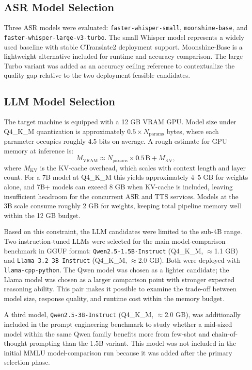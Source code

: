 \documentclass[12pt, a4paper]{article}
\begin{document}
\subsection{ASR Model Selection}

Three ASR models were evaluated: \texttt{faster-whisper-small}, \texttt{moonshine-base}, and\\ \texttt{faster-whisper-large-v3-turbo}. The small Whisper model represents a widely used baseline with stable CTranslate2 deployment support. Moonshine-Base is a lightweight alternative included for runtime and accuracy comparison. The large Turbo variant was added as an accuracy ceiling reference to contextualize the quality gap relative to the two deployment-feasible candidates.

\subsection{LLM Model Selection}

The target machine is equipped with a 12 GB VRAM GPU. Model size under Q4\_K\_M quantization is approximately $0.5 \times N_\text{params}$ bytes, where each parameter occupies roughly 4.5 bits on average. A rough estimate for GPU memory at inference is:
\[
M_\text{VRAM} \approx N_\text{params} \times 0.5\,\text{B} + M_\text{KV},
\]
where $M_\text{KV}$ is the KV-cache overhead, which scales with context length and layer count. For a 7B model at Q4\_K\_M this yields approximately 4--5 GB for weights alone, and 7B+ models can exceed 8 GB when KV-cache is included, leaving insufficient headroom for the concurrent ASR and TTS services. Models at the 3B scale consume roughly 2 GB for weights, keeping total pipeline memory well within the 12 GB budget.

Based on this constraint, the LLM candidates were limited to the sub-4B range. Two instruction-tuned LLMs were selected for the main model-comparison benchmark in GGUF format: \texttt{Qwen2.5-1.5B-Instruct} (Q4\_K\_M, $\approx$1.1 GB) and \texttt{Llama-3.2-3B-Instruct} (Q4\_K\_M, $\approx$2.0 GB). Both were deployed with \texttt{llama-cpp-python}. The Qwen model was chosen as a lighter candidate; the Llama model was chosen as a larger comparison point with stronger expected reasoning ability. This pair makes it possible to examine the trade-off between model size, response quality, and runtime cost within the memory budget.

A third model, \texttt{Qwen2.5-3B-Instruct} (Q4\_K\_M, $\approx$2.0 GB), was additionally included in the prompt engineering benchmark to study whether a mid-sized model within the same Qwen family benefits more from few-shot and chain-of-thought prompting than the 1.5B variant. This model was not included in the initial MMLU model-comparison run because it was added after the primary selection phase.
\end{document}
